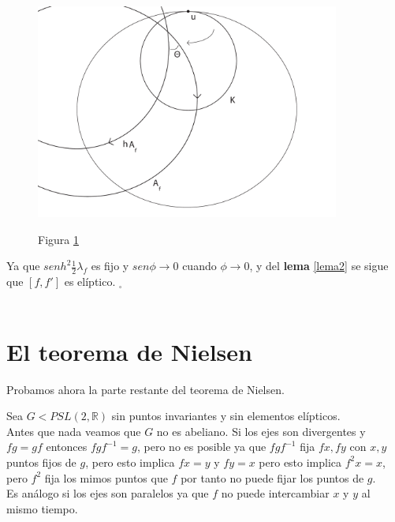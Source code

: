 \begin{figure}[h]
  \centering
  \includegraphics[width=10cm]{lemma5-dibujo3}\\
  \caption{Figura \ref{lemma5-dibujo3}}\label{lemma5-dibujo3}
\end{figure}


Ya que $senh^{2} \frac{1}{2}\lambda_{f}$ es fijo y $sen\phi
\rightarrow 0$ cuando $\phi \rightarrow 0$, y del \textbf{lema} \ref{lema2} se
sigue que $[f,f']$ es el\'iptico. $_{\square}$ \\ \\


\section{El teorema de Nielsen}

Probamos ahora la parte restante del teorema de Nielsen.

Sea $G < PSL(2,\mathbb{R})$ sin puntos invariantes y sin
elementos el\'ipticos. \\

Antes que nada veamos que $G$ no es abeliano. Si los ejes son
divergentes y  $fg = gf$ entonces $fgf^{-1} = g$, pero no es posible
ya que $fgf^{-1}$ fija $fx,fy$ con $x,y $ puntos fijos de $g$, pero
esto implica $fx=y$ y $fy=x$ pero esto implica $f^{2}x=x$, pero
$f^{2}$ fija los mimos puntos que $f$ por tanto no puede fijar los
puntos de $g$. \\

Es an\'alogo si los ejes son paralelos ya que $f$ no puede
intercambiar $x$ y $y$ al mismo tiempo. \\


